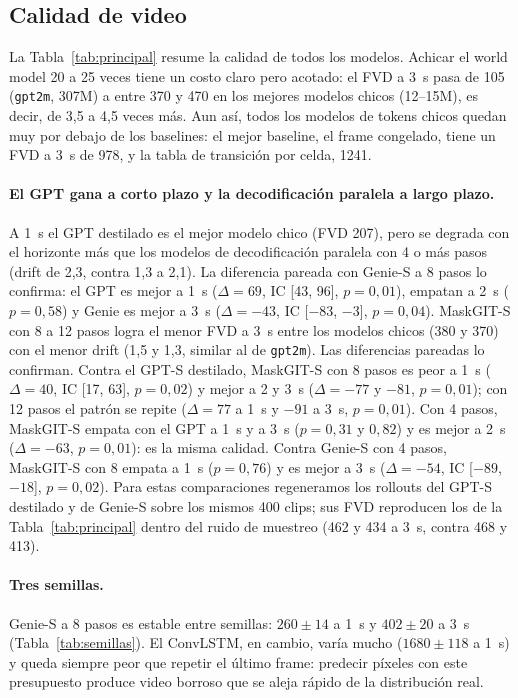 \documentclass[10pt,twocolumn,a4paper]{article}
\DeclareRobustCommand{\editado}[1]{\textcolor{editado}{#1}}
\DeclareRobustCommand{\editado}[1]{#1}
\begin{document}
\subsection{Calidad de video}
\label{sec:calidad}

La Tabla~\ref{tab:principal} resume la calidad de todos los modelos. Achicar el world model 20 a 25 veces tiene un costo claro pero acotado: el FVD a 3~s pasa de 105 (\texttt{gpt2m}, 307M) a entre 370 y 470 en los mejores modelos chicos (12--15M), es decir, de 3,5 a 4,5 veces más. Aun así, todos los modelos de tokens chicos quedan muy por debajo de los baselines: el mejor baseline, el frame congelado, tiene un FVD a 3~s de 978, y la tabla de transición por celda, 1241.

\paragraph{El GPT gana a corto plazo y la decodificación paralela a largo plazo.} A 1~s el GPT destilado es el mejor modelo chico (FVD 207), pero \editado{se degrada con el horizonte más que los modelos de decodificación paralela con 4 o más pasos (drift de 2,3, contra 1,3 a 2,1)}. La diferencia pareada con Genie-S a 8 pasos lo confirma: el GPT es mejor a 1~s ($\Delta=69$, IC [43, 96], $p=0{,}01$), empatan a 2~s ($p=0{,}58$) y Genie es mejor a 3~s ($\Delta=-43$, IC [$-83$, $-3$], $p=0{,}04$). MaskGIT-S con 8 a 12 pasos logra el menor FVD a 3~s entre los modelos chicos (380 y 370) con el menor drift (1,5 y 1,3, similar al de \texttt{gpt2m}). Las diferencias pareadas lo confirman. Contra el GPT-S destilado, MaskGIT-S con 8 pasos es peor a 1~s ($\Delta=40$, IC [17, 63], $p=0{,}02$) y mejor a 2 y 3~s ($\Delta=-77$ y $-81$, $p=0{,}01$); con 12 pasos el patrón se repite ($\Delta=77$ a 1~s y $-91$ a 3~s, $p=0{,}01$). Con 4 pasos, MaskGIT-S empata con el GPT a 1~s y a 3~s ($p=0{,}31$ y $0{,}82$) y es mejor a 2~s ($\Delta=-63$, $p=0{,}01$): es la misma calidad. Contra Genie-S con 4 pasos, MaskGIT-S con 8 empata a 1~s ($p=0{,}76$) y es mejor a 3~s ($\Delta=-54$, IC [$-89$, $-18$], $p=0{,}02$). Para estas comparaciones regeneramos los rollouts del GPT-S destilado y de Genie-S sobre los mismos 400 clips; sus FVD reproducen los de la Tabla~\ref{tab:principal} dentro del ruido de muestreo (462 y 434 a 3~s, contra 468 y 413).

\paragraph{Tres semillas.} Genie-S a 8 pasos es estable entre semillas: $260\pm14$ a 1~s y $402\pm20$ a 3~s (Tabla~\ref{tab:semillas}). El ConvLSTM, en cambio, varía mucho ($1680\pm118$ a 1~s) y queda siempre peor que repetir el último frame: predecir píxeles con este presupuesto produce video borroso que se aleja rápido de la distribución real.
\end{document}
